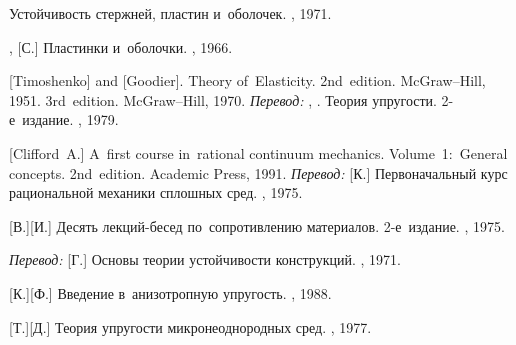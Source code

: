 \begin{thebibliography}{123}
\begin{otherlanguage}{russian}
Устойчивость стержней, пластин и~оболочек.
\naukapublisher, 1971.

,
[С.]
Пластинки и~оболочки.
\naukapublisher, 1966.

[Timoshenko] and [Goodier].
Theory of~Elasticity.
2nd~edition. McGraw\hbox{--}Hill, 1951. 
3rd~edition. McGraw\hbox{--}Hill, 1970. 
\emph{Перевод:}
, .
Теория упругости.
2\hbox{-}е~издание.
\naukapublisher, 1979.

[Clifford~A.]
A~first course in~rational continuum mechanics.
Volume~1:~General concepts.
2nd~edition.
Academic Press,
1991.
%
\emph{Перевод:}
[К.]
Первоначальный курс рациональной механики сплошных сред.
\mirpublisher,
1975.

[В.][И.]
Десять лекций\hbox{-}бесед по~сопротивлению материалов.
2\hbox{-}е~издание.
\naukapublisher, 1975.

\emph{Перевод:}
[Г.]
Основы теории устойчивости конструкций.
\mirpublisher, 1971.

[К.][Ф.]
Введение в~анизотропную упругость.
\naukapublisher,
1988.


[Т.][Д.]
Теория упругости микронеоднородных сред.
\naukapublisher,
1977.


\end{otherlanguage}
\end{thebibliography}
